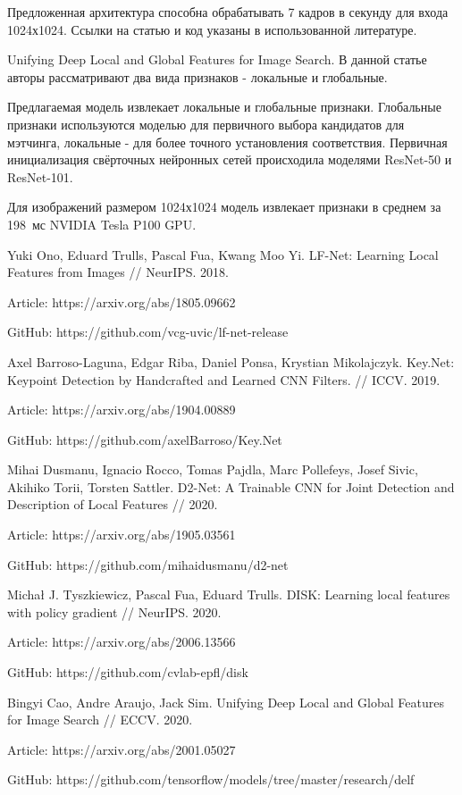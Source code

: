 \documentclass[a4paper]{article}
\begin{document}
Предложенная архитектура способна обрабатывать 7 кадров в секунду для входа 1024х1024. Ссылки на статью и код указаны в использованной литературе. 

Unifying Deep Local and Global Features for Image Search. В данной статье авторы рассматривают два вида признаков - локальные и глобальные.




Предлагаемая модель извлекает локальные и глобальные признаки. Глобальные признаки используются моделью для первичного выбора кандидатов для мэтчинга, локальные - для более точного установления соответствия. Первичная инициализация свёрточных нейронных сетей происходила моделями ResNet-50 и ResNet-101. 


Для изображений размером 1024х1024 модель извлекает признаки в среднем за 198~мс NVIDIA Tesla P100 GPU. 
\newpage

\begin{thebibliography}{40}

 Yuki Ono, Eduard Trulls, Pascal Fua, Kwang Moo Yi. LF-Net: Learning Local Features from Images // NeurIPS. 2018.

Article: https://arxiv.org/abs/1805.09662

GitHub: https://github.com/vcg-uvic/lf-net-release


 Axel Barroso-Laguna, Edgar Riba, Daniel Ponsa, Krystian Mikolajczyk. Key.Net: Keypoint Detection by Handcrafted and Learned CNN Filters. // ICCV. 2019.

Article: https://arxiv.org/abs/1904.00889

GitHub: https://github.com/axelBarroso/Key.Net


 Mihai Dusmanu, Ignacio Rocco, Tomas Pajdla, Marc Pollefeys, Josef Sivic, Akihiko Torii, Torsten Sattler. D2-Net: A Trainable CNN for Joint Detection and Description of Local Features // 2020.

Article: https://arxiv.org/abs/1905.03561

GitHub: https://github.com/mihaidusmanu/d2-net


 Michał J. Tyszkiewicz, Pascal Fua, Eduard Trulls. DISK: Learning local features with policy gradient // NeurIPS. 2020.

Article: https://arxiv.org/abs/2006.13566

GitHub: https://github.com/cvlab-epfl/disk

 Bingyi Cao, Andre Araujo, Jack Sim. Unifying Deep Local and Global Features for Image Search // ECCV. 2020.

Article: https://arxiv.org/abs/2001.05027

GitHub: https://github.com/tensorflow/models/tree/master/research/delf 

\end{thebibliography}
\end{document}
